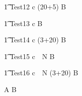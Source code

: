\begin{circusaction}
   \t1 Test12 \circdef  c \then (20+5) B  \\
\end{circusaction}


\begin{circusaction}
   \t1 Test13 \circdef  c  B  \\
\end{circusaction}

\begin{circusaction}
   \t1 Test14 \circdef  c \then  (3+20) B  \\
\end{circusaction}



\begin{circusaction}
   \t1 Test15 \circdef  c~\circat~N  B  \\
\end{circusaction}

\begin{circusaction}
   \t1 Test16 \circdef  c~\circat~N \then (3+20) B  \\
\end{circusaction}

\begin{circusaction}
   \circspot A \circseq B \\
\end{circusaction}

\begin{circus}
    \circend \\
\end{circus}
